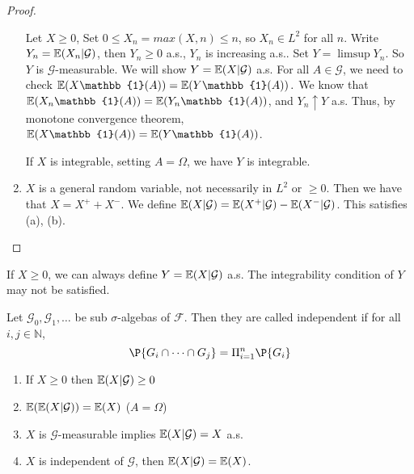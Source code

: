 \begin{proof}
\begin{enumerate}
  Let $X \geq 0$, Set $0 \leq X_{n} = max(X, n) \leq n$, so $X_{n} \in
  L^{2}$ for all $n$. Write $Y_{n} = \E{X_{n} | \mathcal{G}}$, then
  $Y_{n} \geq 0$ a.s., $Y_{n}$ is increasing a.s..  Set $Y = \limsup
  Y_{n}$.  So $Y$ is $\mathcal{G}$-measurable.  We will show $Y = \E{X
    | \mathcal{G}}$ a.s.  For all $A \in \mathcal{G}$, we need to
  check $\E{X \mathbb{1}(A)} = \E{Y \mathbb{1}(A)}.$ We know that
  $\E{X_{n} \mathbb{1}(A)} = \E{Y_{n} \mathbb{1}(A)}$, and $Y_{n}
  \uparrow Y$ a.s.  Thus, by monotone convergence theorem, $\E{X
    \mathbb{1}(A)} = \E{Y\mathbb{1}(A)}$.
  
  If $X$ is integrable, setting $A = \Omega$, we have $Y$ is
  integrable.
\item $X$ is a general random variable, not necessarily in $L^{2}$ or
  $\geq 0$.  Then we have that $X = X^{+} + X^{-}$.  We define $\E{X |
    \mathcal{G}} = \E{X^{+} | \mathcal{G}} - \E{X^{-} | \mathcal{G}}$.
  This satisfies (a), (b).
\end{enumerate}
\end{proof}

\begin{remark}
  If $X \geq 0$, we can always define $Y = \E{X | \mathcal{G}}$ a.s.
  The integrability condition of $Y$ may not be satisfied.
\end{remark}

\begin{defn}
  \label{defn:general:1}
  Let $\mathcal{G}_{0}, \mathcal{G}_{1}, \dots$ be sub $\sigma$-algebas of
  $\mathcal{F}$.  Then they are called independent if for all $i, j
  \in \mathbb{N}$,
  \begin{equation}
    \label{exmp:general:5}
    \P{G_i \cap \dots \cap G_j} = \Pi_{i = 1}^{n} \P{G_{i}}
  \end{equation}
\end{defn}

\begin{thm}
  \begin{enumerate}
  \item If $X \geq 0$ then $\E{X | \mathcal{G}} \geq 0$
  \item $\E{\E{X | \mathcal{G}}} = \E{X}$ ($A = \Omega$)
  \item $X$ is $\mathcal{G}$-measurable implies $\E{X | \mathcal{G}} = X$ a.s.
  \item $X$ is independent of $\mathcal{G}$, then $\E{X|\mathcal{G}} = \E{X}$.
  \end{enumerate}
\end{thm}

